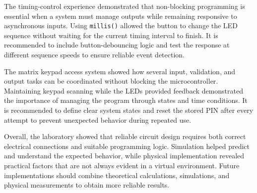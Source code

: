 The timing-control experience demonstrated that non-blocking programming is essential when a system must manage outputs while remaining responsive to asynchronous inputs. Using \texttt{millis()} allowed the button to change the LED sequence without waiting for the current timing interval to finish. It is recommended to include button-debouncing logic and test the response at different sequence speeds to ensure reliable event detection.

The matrix keypad access system showed how several input, validation, and output tasks can be coordinated without blocking the microcontroller. Maintaining keypad scanning while the LEDs provided feedback demonstrated the importance of managing the program through states and time conditions. It is recommended to define clear system states and reset the stored PIN after every attempt to prevent unexpected behavior during repeated use.

Overall, the laboratory showed that reliable circuit design requires both correct electrical connections and suitable programming logic. Simulation helped predict and understand the expected behavior, while physical implementation revealed practical factors that are not always evident in a virtual environment. Future implementations should combine theoretical calculations, simulations, and physical measurements to obtain more reliable results.


%